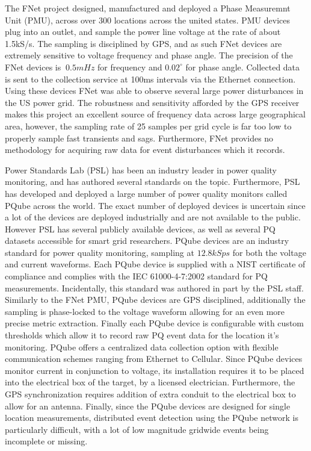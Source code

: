 The FNet project designed, manufactured and deployed a Phase Measuremnt Unit (PMU), across over 300 locations across the united states.\cite{zhang2010wide} PMU devices plug into an outlet, and sample the power line voltage at the rate of about 1.5kS/s. The sampling is disciplined by GPS, and as such FNet devices are extremely sensitive to voltage frequency and phase angle. The precision of the FNet devices is $~0.5mHz$ for frequency and $0.02^{\circ}$ for phase angle. Collected data is sent to the collection service at 100ms intervals via the Ethernet connection. Using these devices FNet was able to observe several large power disturbances in the US power grid. The robustness and sensitivity afforded by the GPS receiver makes this project an excellent source of frequency data across large geographical area, however,  the sampling rate of 25 samples per grid cycle is far too low to properly sample fast transients and sags. Furthermore, FNet provides no methodology for acquiring raw data for event disturbances which it records.

Power Standards Lab (PSL) has been an industry leader in power quality monitoring, and has authored several standards on the topic. Furthermore, PSL has developed and deployed a large number of power quality monitors called PQube across the world. The exact number of deployed devices is uncertain since a lot of the devices are deployed industrially and are not available to the public. However PSL has several publicly available devices, as well as several PQ datasets accessible for smart grid researchers. PQube devices are an industry standard for power quality monitoring, sampling at $12.8kSps$ for both the voltage and current waveforms.\cite{pqube_spec} Each PQube device is supplied with a NIST certificate of compliance and complies with the IEC 61000-4-7:2002 standard for PQ measurements. Incidentally, this standard was authored in part by the PSL staff. Similarly to the FNet PMU, PQube devices are GPS disciplined, additionally the sampling is phase-locked to the voltage waveform allowing for an even more precise metric extraction. Finally each PQube device is configurable with custom thresholds which allow it to record raw PQ event data for the location it's monitoring. PQube offers a centralized data collection option with flexible communication schemes ranging from Ethernet to Cellular. Since PQube devices monitor current in conjunction to voltage, its installation requires it to be placed into the electrical box of the target, by a licensed electrician.\cite{von2014micro} Furthermore, the GPS synchronization requires addition of extra conduit to the electrical box to allow for an antenna. Finally, since the PQube devices are designed for single location measurements, distributed event detection using the PQube network is particularly difficult, with a lot of low magnitude gridwide events being incomplete or missing. 

